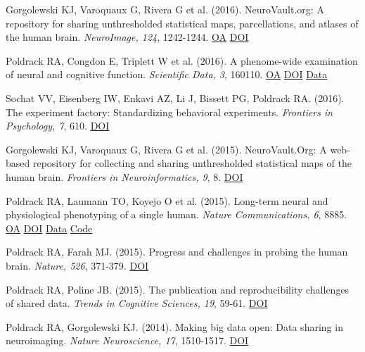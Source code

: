 \documentclass[10pt, letterpaper]{article}
\begin{document}
Gorgolewski KJ, Varoquaux G, Rivera G et al. (2016). NeuroVault.org: A repository for sharing unthresholded statistical maps, parcellations, and atlases of the human brain. \textit{NeuroImage, 124}, 1242-1244. \href{https://www.ncbi.nlm.nih.gov/pmc/articles/PMC4806527}{OA} \href{https://doi.org/10.1016/j.neuroimage.2015.04.016}{DOI} \vspace{2mm}

Poldrack RA, Congdon E, Triplett W et al. (2016). A phenome-wide examination of neural and cognitive function. \textit{Scientific Data, 3}, 160110. \href{https://www.ncbi.nlm.nih.gov/pmc/articles/PMC5139672}{OA} \href{https://doi.org/10.1038/sdata.2016.110}{DOI} \href{https://openneuro.org/datasets/ds000030/versions/1.0.0}{Data} \vspace{2mm}

Sochat VV, Eisenberg IW, Enkavi AZ, Li J, Bissett PG, Poldrack RA.  (2016). The experiment factory: Standardizing behavioral experiments. \textit{Frontiers in Psychology, 7}, 610. \href{https://doi.org/10.3389/fpsyg.2016.00610}{DOI} \vspace{2mm}

Gorgolewski KJ, Varoquaux G, Rivera G et al. (2015). NeuroVault.Org: A web-based repository for collecting and sharing unthresholded statistical maps of the human brain. \textit{Frontiers in Neuroinformatics, 9}, 8. \href{https://doi.org/10.3389/fninf.2015.00008}{DOI} \vspace{2mm}

Poldrack RA, Laumann TO, Koyejo O et al. (2015). Long-term neural and physiological phenotyping of a single human. \textit{Nature Communications, 6}, 8885. \href{https://www.ncbi.nlm.nih.gov/pmc/articles/PMC4682164}{OA} \href{https://doi.org/10.1038/ncomms9885}{DOI} \href{https://openneuro.org/datasets/ds000031/versions/00001}{Data} \href{https://github.com/poldrack/myconnectome}{Code} \vspace{2mm}

Poldrack RA, Farah MJ.  (2015). Progress and challenges in probing the human brain. \textit{Nature, 526}, 371-379. \href{https://doi.org/10.1038/nature15692}{DOI} \vspace{2mm}

Poldrack RA, Poline JB.  (2015). The publication and reproducibility challenges of shared data. \textit{Trends in Cognitive Sciences, 19}, 59-61. \href{https://doi.org/10.1016/j.tics.2014.11.008}{DOI} \vspace{2mm}

Poldrack RA, Gorgolewski KJ.  (2014). Making big data open: Data sharing in neuroimaging. \textit{Nature Neuroscience, 17}, 1510-1517. \href{https://doi.org/10.1038/nn.3818}{DOI} \vspace{2mm}
\end{document}
